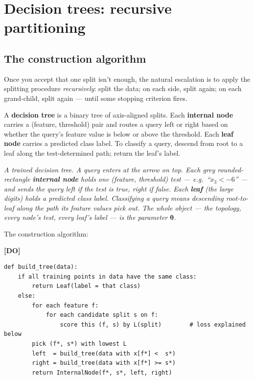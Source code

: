 \documentclass[11pt, a4paper]{article}
\newcommand{\doflag}{\textcolor{defBd}{\textbf{[DO]}}\,}
\begin{document}
\section{Decision trees: recursive partitioning}

\subsection{The construction algorithm}

Once you accept that one split isn't enough, the natural escalation is to apply the splitting procedure \emph{recursively}: split the data; on each side, split again; on each grand-child, split again — until some stopping criterion fires.

\begin{defbox}
A \textbf{decision tree} is a binary tree of axis-aligned splits. Each \textbf{internal node} carries a (feature, threshold) pair and routes a query left or right based on whether the query's feature value is below or above the threshold. Each \textbf{leaf node} carries a predicted class label. To classify a query, descend from root to a leaf along the test-determined path; return the leaf's label.
\end{defbox}

\begin{center}

\footnotesize\textit{A trained decision tree. A query enters at the arrow on top. Each grey rounded-rectangle \textbf{internal node} holds one (feature, threshold) test --- e.g.\ ``$x_3 < -6$'' --- and sends the query left if the test is true, right if false. Each \textbf{leaf} (the large digits) holds a predicted class label. Classifying a query means descending root-to-leaf along the path its feature values pick out. The whole object --- the topology, every node's test, every leaf's label --- \emph{is} the parameter $\boldsymbol\theta$.}
\end{center}

The construction algorithm:

\doflag{}
\begin{verbatim}
def build_tree(data):
    if all training points in data have the same class:
        return Leaf(label = that class)
    else:
        for each feature f:
            for each candidate split s on f:
                score this (f, s) by L(split)        # loss explained below
        pick (f*, s*) with lowest L
        left  = build_tree(data with x[f*] <  s*)
        right = build_tree(data with x[f*] >= s*)
        return InternalNode(f*, s*, left, right)
\end{verbatim}
\end{document}

